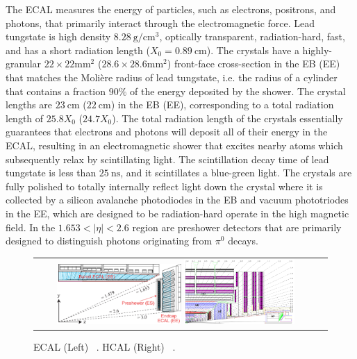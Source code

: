 The ECAL measures the energy of particles, such as electrons, positrons, and photons, that primarily interact through the electromagnetic force.
Lead tungstate is high density $\SI{8.28}{\g\per\cm\cubed}$, optically transparent, radiation-hard, fast, and has a short radiation length ($X_0 = \SI{0.89}{\cm}$).
The crystals have a highly-granular $22 \times 22 \si{\mm\squared}$ ($28.6 \times 28.6 \si{\mm\squared}$) front-face cross-section in the EB (EE) that matches the Molière radius of lead tungstate, i.e. the radius of a cylinder that contains a fraction $90 \%$ of the energy deposited by the shower.
The crystal lengths are $\SI{23}{\cm}$ ($\SI{22}{\cm}$) in the EB (EE), corresponding to a total radiation length of $25.8X_0$ ($24.7X_0$).
The total radiation length of the crystals essentially guarantees that electrons and photons will deposit all of their energy in the ECAL, resulting in an electromagnetic shower that excites nearby atoms which subsequently relax by scintillating light.
The scintillation decay time of lead tungstate is less than $\SI{25}{\ns}$, and it scintillates a blue-green light.
The crystals are fully polished to totally internally reflect light down the crystal where it is collected by a silicon avalanche photodiodes in the EB and vacuum phototriodes in the EE, which are designed to be radiation-hard operate in the high magnetic field.
In the $1.653 < \vert \eta \vert < 2.6$ region are preshower detectors that are primarily designed to distinguish photons originating from $\pi^0$ decays.

\begin{figure}[!htb]
  \begin{center}
    \begin{tabular}{cc}
        \includegraphics[width=0.45\textwidth]{fig_LHC_CMS/ECAL.pdf}
        \includegraphics[width=0.40\textwidth]{fig_LHC_CMS/HCAL.png}
    \end{tabular}
    \caption{ECAL (Left) ~\cite{Bayatian:922757}.
            HCAL (Right) ~\cite{Chatrchyan:1129810}.
            }
    \label{ECAL_HCAL}
  \end{center}
\end{figure}

